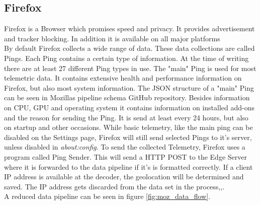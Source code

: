 \newpage
    \subsection{Firefox}
        Firefox is a Browser which promises speed and privacy. It provides advertisement and tracker blocking. In addition it is available on all major platforms\\ 
        By default Firefox collects a wide range of data. These data collections are called Pings. Each Ping contains a certain type of information. At the time of writing there are at least 27 different Ping types in use\cite{mozilla_telemetry_nodate}.
        The "main" Ping is used for most telemetric data. It contains extensive health and performance information on Firefox, but also most system information. The JSON structure of a "main" Ping can be seen in Mozillas pipeline schema GitHub repository\cite{mozilla_mozilla-servicesmozilla-pipeline-schemas_2020}. 
        Besides information on CPU, GPU and operating system it contains information on installed add-ons and the reason for sending the Ping.
        It is send at least every 24 hours, but also on startup and other occasions. While basic telemetry, like the main ping can be disabled on the Settings page, Firefox will still send selected Pings to it's server, unless disabled in \textit{about:config}.
        To send the collected Telemetry, Firefox uses a program called Ping Sender.
        This will send a HTTP POST to the Edge Server where it is forwarded to the data pipeline if it's is formatted correctly.
        If a client IP address is available at the decoder, the geolocation will be determined and saved.
        The IP address gets discarded from the data set in the process\cite{mozilla_overview_2020},\cite{mozilla_http_2020},\cite{firefox_ping_nodate}.\\
        A reduced data pipeline can be seen in figure \ref{fig:moz_data_flow}.
        
